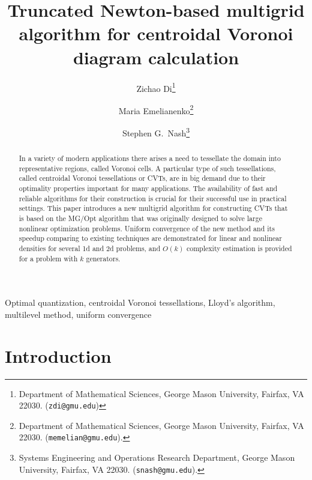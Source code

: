 \documentclass{siamltex}
\title{\bf Truncated Newton-based multigrid algorithm for centroidal Voronoi diagram calculation}
\author{Zichao Di\thanks{Department of Mathematical Sciences, George Mason University,
  Fairfax, VA 22030. ({\tt zdi@gmu.edu})}
\and Maria Emelianenko\thanks{Department of Mathematical Sciences, George Mason University,
  Fairfax, VA 22030. ({\tt memelian@gmu.edu}).}
\and Stephen G.~Nash\thanks{Systems Engineering and Operations Research Department, George Mason University,
  Fairfax, VA 22030. ({\tt snash@gmu.edu}).
  }
}
\begin{document}
\maketitle


\begin{abstract}
In a variety of modern applications there arises a need to tessellate the domain into representative regions, called Voronoi cells. A particular type of such tessellations, called centroidal Voronoi tessellations or CVTs, are in big demand due to their optimality properties important for many applications. The availability of fast and reliable algorithms for their construction is crucial for their successful use in practical settings. This paper introduces a new multigrid algorithm for constructing CVTs that is based on the MG/Opt algorithm that was originally designed to solve large nonlinear optimization problems. Uniform convergence of the new method and its speedup comparing to existing techniques are demonstrated for linear and nonlinear densities for several 1d and 2d problems, and $O(k)$ complexity estimation is provided for a problem with $k$ generators.

\end{abstract}

\begin{keywords}
Optimal quantization, centroidal Voronoi tessellations,
Lloyd's algorithm, multilevel method, uniform convergence
\end{keywords}

\section{Introduction}\label{sec:1}

\end{document}
